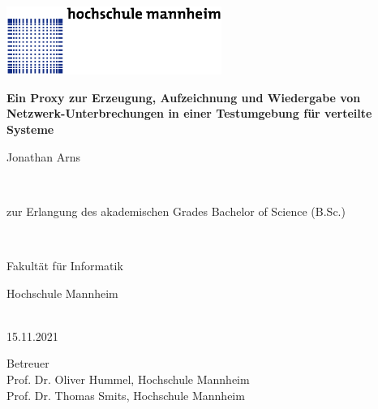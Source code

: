 \documentclass[12pt,a4paper]{report}
\begin{document}
\begin{titlepage}
    \noindent\includegraphics[width=7cm]{img/hs_logo.png}
    \begin{center}
        \sffamily
        \Large
        \textbf{Ein Proxy zur Erzeugung, Aufzeichnung und Wiedergabe von Netzwerk-Unterbrechungen in einer Testumgebung für verteilte Systeme}

        \vspace{1cm}

        \large
        \begin{Large}Jonathan Arns\end{Large}

        \vspace{1.5cm}
                
        
        \\
        \begin{small}zur Erlangung des akademischen Grades Bachelor of Science (B.Sc.)\end{small}\\

        \vspace{1cm}
                
        Fakultät für Informatik\\
        \begin{Large}Hochschule Mannheim\end{Large}\\
        
        \vspace{1cm}
        15.11.2021

        \vfill

        Betreuer\\
        Prof. Dr. Oliver Hummel, Hochschule Mannheim\\
        Prof. Dr. Thomas Smits, Hochschule Mannheim\\
   \end{center}
\end{titlepage}

\tableofcontents
\setlength{\parindent}{0em}
\setlength{\parskip}{0.6em}

\end{document}
